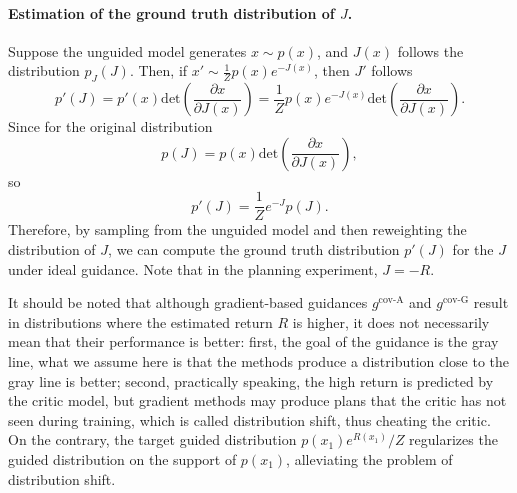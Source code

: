 \paragraph{Estimation of the ground truth distribution of $J$.}
Suppose the unguided model generates $x\sim p(x)$, and $J(x)$ follows the distribution $p_J(J)$. Then, if $x'\sim \frac{1}{Z}p(x)e^{-J(x)}$, then $J'$ follows 
\begin{equation}
    p'(J) = p'(x)\text{det}\left(\frac{\partial x}{\partial J(x)}\right) = \frac{1}{Z}p(x)e^{-J(x)}\text{det}\left(\frac{\partial x}{\partial J(x)}\right).
\end{equation}
Since for the original distribution 
\begin{equation}
    p(J) = p(x) \text{det}\left(\frac{\partial x}{\partial J(x)}\right),
\end{equation}
so
\begin{equation}
    p'(J) = \frac{1}{Z}e^{-J}p(J).
\end{equation}
Therefore, by sampling from the unguided model and then reweighting the distribution of $J$, we can compute the ground truth distribution $p'(J)$ for the $J$ under ideal guidance. Note that in the planning experiment, $J=-R$.

It should be noted that although gradient-based guidances $g^{\text{cov-A}}$ and $g^{\text{cov-G}}$ result in distributions where the estimated return $R$ is higher, it does not necessarily mean that their performance is better: first, the goal of the guidance is the gray line, what we assume here is that the methods produce a distribution close to the gray line is better; second, practically speaking, the high return is predicted by the critic model, but gradient methods may produce plans that the critic has not seen during training, which is called distribution shift, thus cheating the critic. 
On the contrary, the target guided distribution $p(x_1)e^{R(x_1)} / Z$ regularizes the guided distribution on the support of $p(x_1)$, alleviating the problem of distribution shift.


